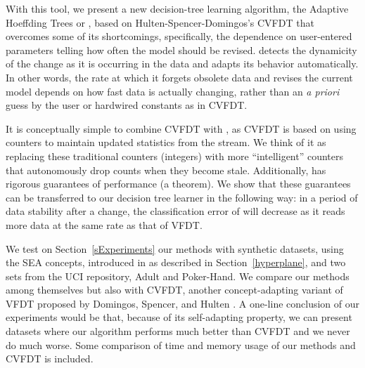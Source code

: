 \BEGINOMIT
With this tool, we present a new decision-tree learning algorithm, 
the Adaptive Hoeffding Trees or \adwindtb, 
based on Hulten-Spencer-Domingos's CVFDT that overcomes some of its shortcomings, 
specifically, the dependence on user-entered parameters telling how often the model should be revised. %
\adwindt detects the dynamicity of the change as it is occurring in the data
and adapts its behavior automatically. In other words, the rate at which it forgets obsolete
data and revises the current model depends on how fast data is actually changing, 
rather than an {\em a priori} guess by the user or hardwired constants as in CVFDT. 

It is conceptually simple to combine CVFDT 
with \adwinb, as CVFDT is based on using counters to maintain updated
statistics from the stream. We think of it as replacing these traditional counters (integers)
with more ``intelligent'' counters that autonomously drop counts when they become stale. 
Additionally, \adwin has rigorous guarantees of performance (a theorem). We show
that these guarantees can be transferred to our decision tree learner \adwindt 
in the following way: in a period of data stability after a change, 
the classification error of \adwindt %
will decrease as it reads more data 
at the same rate as that of VFDT. 



We test on Section~\ref{sExperiments} our methods with synthetic datasets, 
using the SEA concepts, 
introduced in%
as described in Section~\ref{hyperplane},  %
 and two sets from the UCI repository, Adult and Poker-Hand. 
We compare our methods among themselves but also with CVFDT, another concept-adapting variant of 
VFDT proposed by Domingos, Spencer, and Hulten \cite{hulten-mining}.
A one-line conclusion of our experiments would be that, because of its self-adapting property, 
we can present datasets where our algorithm performs much better than CVFDT
and we never do much worse. 
Some comparison of time and memory usage of our methods and CVFDT is included. 

